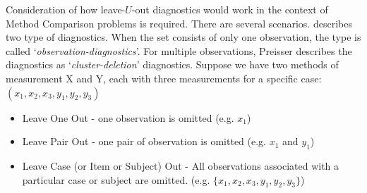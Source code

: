 \documentclass[12pt, a4paper]{report}
\theoremstyle{plain}
\theoremstyle{definition}
\theoremstyle{remark}
\begin{document}
	
%	






%
%	
%	
%	


%		


Consideration of how leave-$U$-out diagnostics would work in the context of Method Comparison problems is required. There are several scenarios. \citet{preisser} describes two type of diagnostics. When the set consists of only one observation, the type is called
`\textit{observation-diagnostics}'. For multiple observations, Preisser describes the diagnostics as `\textit{cluster-deletion}' diagnostics. Suppose we have two methods of measurement X and Y, each with three measurements for a specific case: $(x_1,x_2,x_3,y_1,y_2,y_3)$

\begin{itemize}
	\item Leave One Out - one observation is omitted (e.g. $x_1$)
	\item Leave Pair Out - one pair of observation  is omitted (e.g. $x_1$ and $y_1$)
	\item Leave Case (or Item or Subject) Out - All observations associated with a particular case or subject are omitted. (e.g. $\{x_1,x_2,x_3,y_1,y_2,y_3\}$)
\end{itemize}
\end{document}
